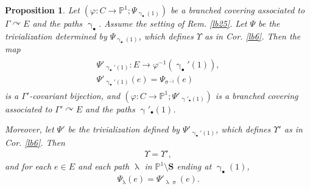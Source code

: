 \documentclass[11pt,b5paper,notitlepage]{article}
\theoremstyle{definition}
\theoremstyle{plain}
\newtheorem{pp}[df]{Proposition}
\newcommand{\blt}{\bullet}
\newcommand{\Pbb}{\mathbb P}
\newcommand{\Sbf}{\mathbf{S}}
\numberwithin{equation}{subsection}
\begin{document}
\begin{pp}\label{lb26}
Let $(\varphi:C\rightarrow\Pbb^1;\Psi_{\upgamma_\blt(1)})$ be a branched covering associated to $\Gamma\curvearrowright E$ and the paths $\upgamma_\blt$. Assume the setting of Rem. \ref{lb25}. Let $\Psi$ be the trivialization determined by $\Psi_{\upgamma_\blt(1)}$, which defines $\Upsilon$ as in Cor. \ref{lb6}. Then the map
\begin{gather}\label{eq70}
\begin{array}{c}
	\Psi'_{\upgamma_\blt'(1)}:E\rightarrow \varphi^{-1}(\upgamma_\blt'(1)),\\[0.8ex]
	\Psi'_{\upgamma_\blt'(1)}(e)=\Psi_{\upsigma^{-1}}(e)
\end{array}	
\end{gather}
is a $\Gamma'$-covariant bijection, and $(\varphi:C\rightarrow\Pbb^1;\Psi'_{\upgamma'_\blt(1)})$ is a branched covering associated to $\Gamma'\curvearrowright E$ and the paths ${\upgamma'_\blt(1)}$.

Moreover, let $\Psi'$ be the trivialization defined by $\Psi'_{\upgamma_\blt'(1)}$, which defines $\Upsilon'$ as in Cor. \ref{lb6}. Then
\begin{align*}
\Upsilon=\Upsilon',	
\end{align*}
and for each $e\in E$ and each path $\uplambda$ in $\Pbb^1\setminus\Sbf$ ending at $\upgamma_\blt(1)$, 
\begin{gather}
\Psi_{\uplambda}(e)=\Psi'_{\uplambda\upsigma}(e).	\label{eq52}
\end{gather}
\end{pp}
\end{document}
